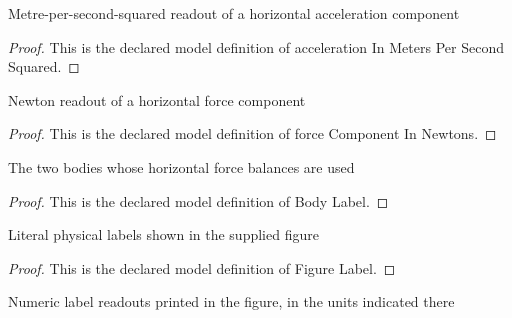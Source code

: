 \begin{definition}
  \label{def:physics:phyx-mini-0804:phyxminiproblems-problemphyxmini0804-accelerationinmeterspersecondsquared}
  Metre-per-second-squared readout of a horizontal acceleration component
\end{definition}
\begin{proof}
  This is the declared model definition of acceleration In Meters Per Second Squared.
\end{proof}
\begin{definition}
  \label{def:physics:phyx-mini-0804:phyxminiproblems-problemphyxmini0804-forcecomponentinnewtons}
  Newton readout of a horizontal force component
\end{definition}
\begin{proof}
  This is the declared model definition of force Component In Newtons.
\end{proof}
\begin{definition}
  \label{def:physics:phyx-mini-0804:phyxminiproblems-problemphyxmini0804-bodylabel}
  The two bodies whose horizontal force balances are used
\end{definition}
\begin{proof}
  This is the declared model definition of Body Label.
\end{proof}
\begin{definition}
  \label{def:physics:phyx-mini-0804:phyxminiproblems-problemphyxmini0804-figurelabel}
  Literal physical labels shown in the supplied figure
\end{definition}
\begin{proof}
  This is the declared model definition of Figure Label.
\end{proof}
\begin{definition}
  \label{def:physics:phyx-mini-0804:phyxminiproblems-problemphyxmini0804-figurereadouts}
  Numeric label readouts printed in the figure, in the units indicated there
\end{definition}
